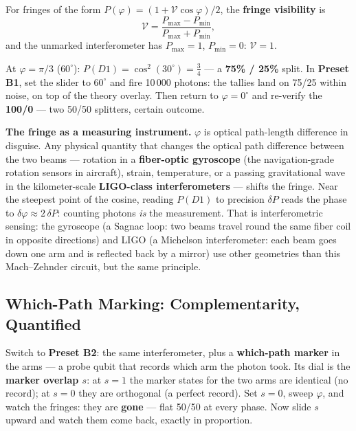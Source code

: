 \documentclass[a4paper,11pt]{article}
\begin{document}
For fringes of the form $P(\varphi) = (1 + \mathcal{V}\cos\varphi)/2$, the
\textbf{fringe visibility} is
\begin{equation}
    \mathcal{V} = \frac{P_{\max} - P_{\min}}{P_{\max} + P_{\min}},
    \label{eq:vis}
\end{equation}
and the unmarked interferometer has $P_{\max} = 1$, $P_{\min} = 0$:
$\mathcal{V} = 1$.

\begin{numberbox}
At $\varphi = \pi/3$ ($60^\circ$): $P(D1) = \cos^2(30^\circ) = \tfrac34$ --- a
\textbf{75\% / 25\%} split. In \textbf{Preset B1}, set the slider to $60^\circ$ and
fire 10\,000 photons: the tallies land on 75/25 within noise, on top of the theory
overlay. Then return to $\varphi = 0^\circ$ and re-verify the \textbf{100/0} --- two
50/50 splitters, certain outcome.
\end{numberbox}

\begin{industrybox}
\textbf{The fringe as a measuring instrument.} $\varphi$ is optical path-length
difference in disguise. Any physical quantity that changes the optical path difference between the two
beams --- rotation in
a \textbf{fiber-optic gyroscope} (the navigation-grade rotation sensors in aircraft),
strain, temperature, or a passing gravitational wave in the kilometer-scale
\textbf{LIGO-class interferometers} --- shifts the fringe. Near the steepest point of
the cosine, reading $P(D1)$ to precision $\delta P$ reads the phase to
$\delta\varphi \approx 2\,\delta P$: counting photons \emph{is} the measurement. That
is interferometric sensing: the gyroscope (a Sagnac loop: two beams travel round the
same fiber coil in opposite directions) and LIGO (a Michelson interferometer: each beam
goes down one arm and is reflected back by a mirror) use other geometries than this
Mach--Zehnder circuit, but the same principle.
\end{industrybox}

\subsection{Which-Path Marking: Complementarity, Quantified}

\begin{benchbox}
Switch to \textbf{Preset B2}: the same interferometer, plus a \textbf{which-path
marker} in the arms --- a probe qubit that records which arm the photon took. Its
dial is the \textbf{marker overlap $s$}: at $s = 1$ the marker states for the two
arms are identical (no record); at $s = 0$ they are orthogonal (a perfect record).
Set $s = 0$, sweep $\varphi$, and watch the fringes: they are \textbf{gone} --- flat
50/50 at every phase. Now slide $s$ upward and watch them come back, exactly in
proportion.
\end{benchbox}
\end{document}
